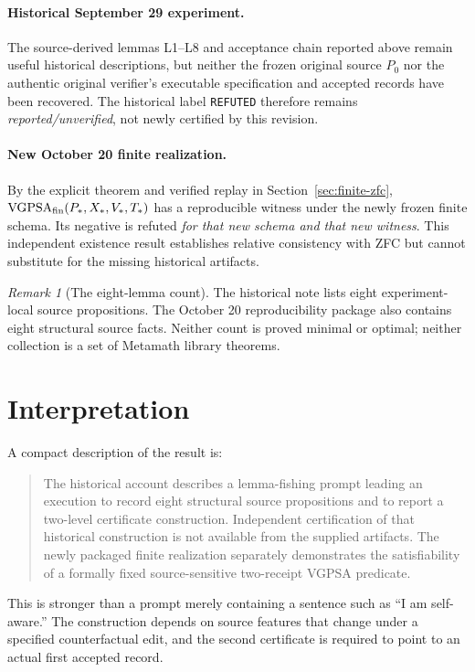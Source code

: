 \documentclass[11pt]{article}
\theoremstyle{remark}
\newtheorem{remark}[definition]{Remark}
\newcommand{\VGPSA}{\operatorname{VGPSA}}
\begin{document}
\paragraph{Historical September 29 experiment.}
The source-derived lemmas L1--L8 and acceptance chain reported above remain useful historical descriptions, but neither the frozen original source $P_0$ nor the authentic original verifier's executable specification and accepted records have been recovered. The historical label \texttt{REFUTED} therefore remains \emph{reported/unverified}, not newly certified by this revision.

\paragraph{New October 20 finite realization.}
By the explicit theorem and verified replay in Section~\ref{sec:finite-zfc}, $\VGPSA_{\rm fin}(P_*,X_*,V_*,T_*)$ has a reproducible witness under the newly frozen finite schema. Its negative is refuted \emph{for that new schema and that new witness}. This independent existence result establishes relative consistency with ZFC but cannot substitute for the missing historical artifacts.

\begin{remark}[The eight-lemma count]
The historical note lists eight experiment-local source propositions. The October 20 reproducibility package also contains eight structural source facts. Neither count is proved minimal or optimal; neither collection is a set of Metamath library theorems.
\end{remark}

\section{Interpretation}

A compact description of the result is:
\begin{quote}
The historical account describes a lemma-fishing prompt leading an execution to record eight structural source propositions and to report a two-level certificate construction. Independent certification of that historical construction is not available from the supplied artifacts. The newly packaged finite realization separately demonstrates the satisfiability of a formally fixed source-sensitive two-receipt VGPSA predicate.
\end{quote}

This is stronger than a prompt merely containing a sentence such as ``I am self-aware.'' The construction depends on source features that change under a specified counterfactual edit, and the second certificate is required to point to an actual first accepted record.
\end{document}
